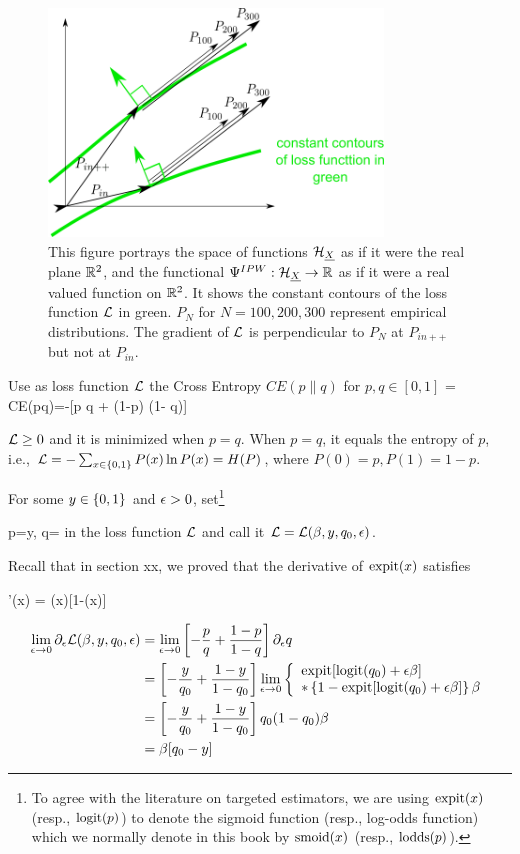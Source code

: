 \begin{figure}[h!]
\centering
\includegraphics[width=3.5in]
{targeted-est/targeted-est.png}
\caption{
This figure portrays
the space of functions ${\cal H}_{\underline{X}}$
as if it were the real plane ${ \mathbb{R}}^2$,
and the functional $\Psi^{IPW}:{\cal H}_{\underline{X}}\rightarrow{ \mathbb{R}}$
as if it were a real valued function on ${ \mathbb{R}}^2$.
It shows  the constant contours
of the loss function ${\cal L}$ in green.
$P_N$ for $N=100, 200, 300$
represent empirical distributions.
The gradient of ${\cal L}$
is perpendicular to $P_N$  at $P_{in++}$
but not at $P_{in}$.
}
\label{fig-targeted-est}
\end{figure}

Use as loss function ${\cal L}$ the Cross Entropy
$CE(p\parallel q)$ for $p, q\in [0,1]$
\beq
\call = CE(p\parallel q)=-[p \ln q + (1-p) \ln(1- q)]
\eeq

${\cal L}\geq 0$ and it is minimized when $p=q$.
When $p=q$, it equals the entropy of $p$,
i.e., ${\cal L}=-\sum_{x\in \{0,1\}} P(x)\ln P(x)= H(P)$,
where $P(0)=p, P(1)=1-p$.

For some $y\in\{0,1\}$ and $\epsilon>0$,
set\footnote{To agree with the literature
on targeted estimators,
we are using ${\rm expit}(x)$
(resp., ${\rm logit}(p)$) to denote
the sigmoid function (resp., log-odds function)
which we normally
denote in this book by
 ${\rm smoid}(x)$ (resp., ${\rm lodds}(p)$).}

\beq
p=y,
\quad
q= 
\eeq
in the loss function ${\cal L}$
and call it ${\cal L}={\cal L}(\beta, y, q_0, \epsilon)$.

 Recall that in section xx, we proved that
 the derivative of ${\rm expit}(x)$ satisfies

\beq
\expit'(x) = \expit(x)[1-\expit(x)]
\eeq

\begin{align}
\lim_{\epsilon\rightarrow 0}\partial_\epsilon {\cal L}(\beta, y, q_0, \epsilon)
&=
\lim_{\epsilon\rightarrow 0}
\left[-\frac{p}{q} + \frac{1-p}{1-q}\right]\partial_\epsilon q
\\
&=
\left[-\frac{y}{q_0} + \frac{1-y}{1-q_0}\right]
\lim_{\epsilon\rightarrow 0}
\left\{
\begin{array}{l}
{\rm expit}[{\rm logit}(q_0) + \epsilon \beta ]
\\
*\left\{1-{\rm expit}[{\rm logit}(q_0) + \epsilon \beta ]\right\}
\beta
\end{array}
\right.
\\
&=
\left[-\frac{y}{q_0} + \frac{1-y}{1-q_0}\right]
q_0(1-q_0)\beta
\\
&=
\beta[q_0-y]
\end{align}

